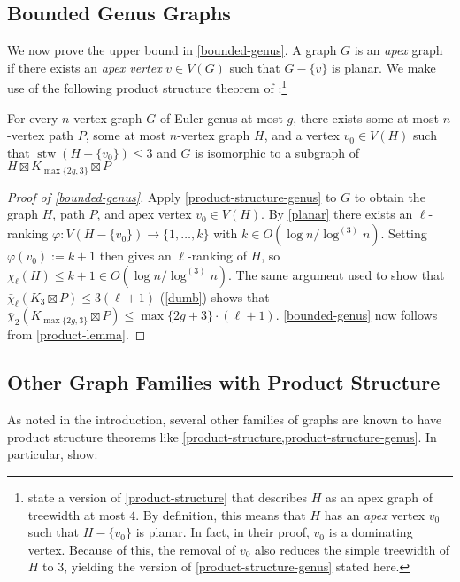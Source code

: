 \documentclass[kpfonts]{patmorin}
\DeclareMathOperator{\stw}{stw}
\newcommand{\lrn}{\chi_{\ell}}
\newcommand{\dtcn}{\bar{\chi}_2}
\newcommand{\dlcn}{\bar{\chi}_\ell}
\theoremstyle{named}
\begin{document}
\subsection{Bounded Genus Graphs}

We now prove the upper bound in \cref{bounded-genus}. A graph $G$ is an \emph{apex} graph if there exists an \emph{apex vertex} $v\in V(G)$ such that $G-\{v\}$ is planar. We make use of the following product structure theorem of \citet{dujmovic.joret.ea:planar}:\footnote{\citet{dujmovic.joret.ea:planar} state a version of \cref{product-structure} that describes $H$ as an apex graph of treewidth at most $4$.  By definition, this means that $H$ has an \emph{apex} vertex $v_0$ such that $H-\{v_0\}$ is planar.  In fact, in their proof, $v_0$ is a dominating vertex.  Because of this, the removal of $v_0$ also reduces the simple treewidth of $H$ to 3, yielding the version of \cref{product-structure-genus} stated here.}

\begin{thm} \label{product-structure-genus}
    For every $n$-vertex graph $G$ of Euler genus at most $g$, there exists some at most $n$-vertex path $P$, some at most $n$-vertex graph $H$, and a vertex $v_0\in V(H)$ such that $\stw(H-\{v_0\})\le 3$ and $G$ is isomorphic to a subgraph of $H\boxtimes K_{\max\{2g,3\}}\boxtimes P$
\end{thm}

\begin{proof}[Proof of \cref{bounded-genus}]
    Apply \cref{product-structure-genus} to $G$ to obtain the graph $H$, path $P$, and apex vertex $v_0\in V(H)$.  By \cref{planar} there exists an $\ell$-ranking $\varphi:V(H-\{v_0\})\to \{1,\ldots,k\}$ with $k\in O(\log n/\log^{(3)} n)$. Setting $\varphi(v_0):=k+1$ then gives an $\ell$-ranking of $H$, so $\lrn(H)\le k+1\in O(\log n/\log^{(3)} n)$.  The same argument used to show that $\dlcn(K_3\boxtimes P)\le 3(\ell+1)$ (\cref{dumb}) shows that $\dtcn(K_{\max\{2g,3\}}\boxtimes P)\le \max\{2g+3\}\cdot(\ell+1)$.  \cref{bounded-genus} now follows from \cref{product-lemma}.
\end{proof}

\subsection{Other Graph Families with Product Structure}

As noted in the introduction, several other families of graphs are known to have product structure theorems like \cref{product-structure,product-structure-genus}.  In particular, \citet{dujmovic.joret.ea:planar} show:
\end{document}
